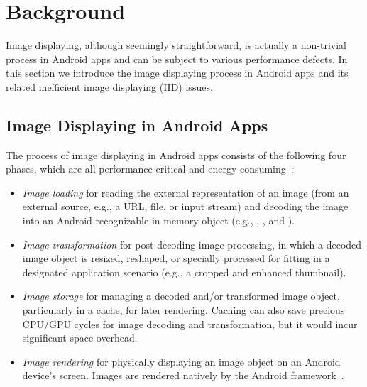 \section{Background} \label{sec:background}

Image displaying, although seemingly straightforward, is actually a non-trivial process in Android apps and can be subject to various performance defects.
In this section we introduce the image displaying process in Android apps and its related inefficient image displaying (IID) issues.


\subsection{Image Displaying in Android Apps}

The process of image displaying in Android apps consists of the following four phases, which are all performance-critical and energy-consuming~\cite{handle_image}:

\begin{itemize}  
  \item \emph{Image loading} for reading the external representation of an image (from an external source, e.g., a URL, file, or input stream) and decoding the image into an Android-recognizable in-memory object (e.g., , , and ).

  \item \emph{Image transformation} for post-decoding image processing, in which a decoded image object is resized, reshaped,
  or specially processed for fitting in a designated application scenario (e.g., a cropped and enhanced thumbnail).

  \item \emph{Image storage} for managing a decoded and/or transformed image object, particularly in a cache, for later rendering.
  Caching can also save precious CPU/GPU cycles for image decoding and transformation, but it would incur significant space overhead.
  \item \emph{Image rendering} for physically displaying an image object on an Android device's screen.
  Images are rendered natively by the Android framework~\cite{Android_framework}.
\end{itemize}

